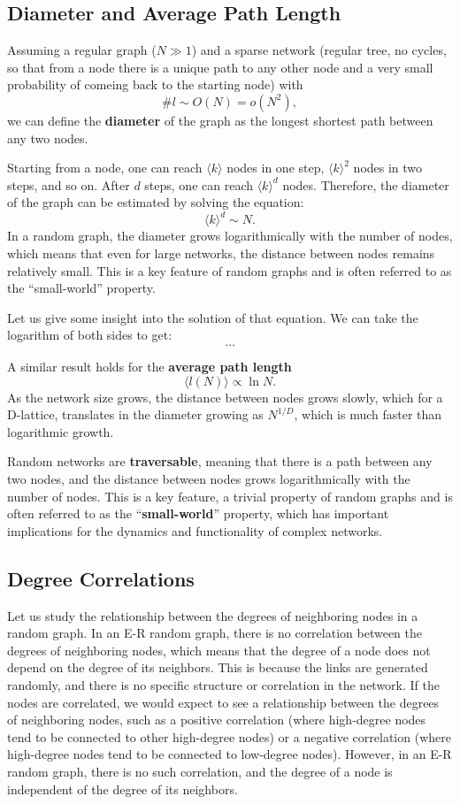 \subsection{Diameter and Average Path Length}

Assuming a regular graph ($N \gg 1$) and a sparse network (regular tree, no cycles, so that from a node there is a unique path to any other node and a very small probability of comeing back to the starting node) with
\[
    \# l \sim O(N) = o(N^2),
\]
we can define the \textbf{diameter} of the graph as the longest shortest path between any two nodes.

Starting from a node, one can reach $\langle k \rangle$ nodes in one step, $\langle k \rangle^2$ nodes in two steps, and so on. After $d$ steps, one can reach $\langle k \rangle^d$ nodes. Therefore, the diameter of the graph can be estimated by solving the equation:
\[
    \langle k \rangle^d \sim N.
\]
In a random graph, the diameter grows logarithmically with the number of nodes, which means that even for large networks, the distance between nodes remains relatively small. This is a key feature of random graphs and is often referred to as the ``small-world'' property.

Let us give some insight into the solution of that equation. We can take the logarithm of both sides to get:
\[
    \dots
\]

A similar result holds for the \textbf{average path length}
\[
    \langle l(N) \rangle \propto \ln N.
\]
As the network size grows, the distance between nodes grows slowly, which for a D-lattice, translates in the diameter growing as $N^{1/D}$, which is much faster than logarithmic growth.

Random networks are \textbf{traversable}, meaning that there is a path between any two nodes, and the distance between nodes grows logarithmically with the number of nodes. This is a key feature, a trivial property of random graphs and is often referred to as the ``\textbf{small-world}'' property, which has important implications for the dynamics and functionality of complex networks.

\subsection{Degree Correlations}

Let us study the relationship between the degrees of neighboring nodes in a random graph. In an E-R random graph, there is no correlation between the degrees of neighboring nodes, which means that the degree of a node does not depend on the degree of its neighbors. This is because the links are generated randomly, and there is no specific structure or correlation in the network. If the nodes are correlated, we would expect to see a relationship between the degrees of neighboring nodes, such as a positive correlation (where high-degree nodes tend to be connected to other high-degree nodes) or a negative correlation (where high-degree nodes tend to be connected to low-degree nodes). However, in an E-R random graph, there is no such correlation, and the degree of a node is independent of the degree of its neighbors.

